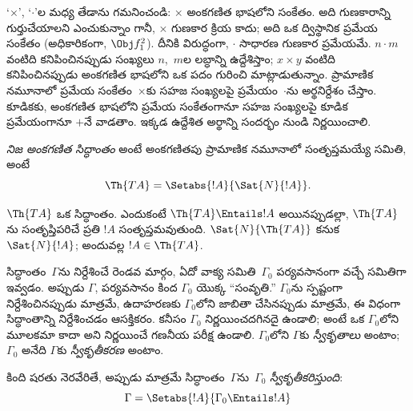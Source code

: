 \documentclass[../../../include/open-logic-section]{subfiles}
\begin{document}
`$\times$', `$\cdot$'ల మధ్య తేడాను గమనించండి: $\times$ అంకగణిత భాషలోని
సంకేతం. అది గుణకారాన్ని గుర్తుచేయాలని ఎంచుకున్నాం గానీ, $\times$ గుణకార క్రియ
కాదు; అది ఒక ద్విస్థానిక ప్రమేయ సంకేతం (అధికారికంగా, $\Obj f^2_1$). దీనికి
విరుద్ధంగా, $\cdot$ సాధారణ గుణకార ప్రమేయమే. $n \cdot m$ వంటిది కనిపించినప్పుడు
సంఖ్యలు $n$,~$m$ల లబ్ధాన్ని ఉద్దేశిస్తాం; $x \times y$ వంటిది కనిపించినప్పుడు
అంకగణిత భాషలోని ఒక పదం గురించి మాట్లాడుతున్నాం. ప్రామాణిక నమూనాలో ప్రమేయ
సంకేతం~$\times$కు సహజ సంఖ్యలపై ప్రమేయం~$\cdot$ను అర్థనిర్దేశం చేస్తాం. కూడికకు,
అంకగణిత భాషలోని ప్రమేయ సంకేతంగానూ సహజ సంఖ్యలపై కూడిక ప్రమేయంగానూ $+$నే
వాడతాం. ఇక్కడ ఉద్దేశిత అర్థాన్ని సందర్భం నుండి నిర్ణయించాలి.

\begin{defn}
\emph{నిజ అంకగణిత సిద్ధాంతం} అంటే అంకగణితపు ప్రామాణిక నమూనాలో సంతృప్తమయ్యే
 సమితి, అంటే
\[
\Th{TA} = \Setabs{!A}{\Sat{N}{!A}}.
\]
\end{defn}

$\Th{TA}$ ఒక సిద్ధాంతం. ఎందుకంటే $\Th{TA} \Entails !A$ అయినప్పుడల్లా,
$\Th{TA}$ను సంతృప్తిపరిచే ప్రతి  $!A$
సంతృప్తమవుతుంది. $\Sat{N}{\Th{TA}}$ కనుక $\Sat{N}{!A}$; అందువల్ల
$!A \in \Th{TA}$.

సిద్ధాంతం~$\Gamma$ను నిర్దేశించే రెండవ మార్గం, ఏదో వాక్య సమితి~$\Gamma_0$
పర్యవసానంగా వచ్చే  సమితిగా ఇవ్వడం. అప్పుడు
$\Gamma$, పర్యవసానం కింద $\Gamma_0$ యొక్క ``సంవృతి.'' $\Gamma_0$ను స్పష్టంగా
నిర్దేశించినప్పుడు మాత్రమే, ఉదాహరణకు $\Gamma_0$లోని
 జాబితా చేసినప్పుడు మాత్రమే, ఈ విధంగా సిద్ధాంతాన్ని
నిర్దేశించడం ఆసక్తికరం. కనీసం $\Gamma_0$ నిర్ణయించదగినదై
ఉండాలి; అంటే ఒక  $\Gamma_0$లోని మూలకమా కాదా
అని నిర్ణయించే గణనీయ పరీక్ష ఉండాలి. $\Gamma_0$లోని
 $\Gamma$కు \emph{స్వీకృతాలు} అంటాం;
$\Gamma_0$ అనేది $\Gamma$కు \emph{స్వీకృతీకరణ} అంటాం.

\begin{defn}
కింది షరతు నెరవేరితే, అప్పుడు మాత్రమే సిద్ధాంతం~$\Gamma$ను~$\Gamma_0$
\emph{స్వీకృతీకరిస్తుంది}:
\[
\Gamma = \Setabs{!A}{\Gamma_0 \Entails !A}
\]
\end{defn}
\end{document}

